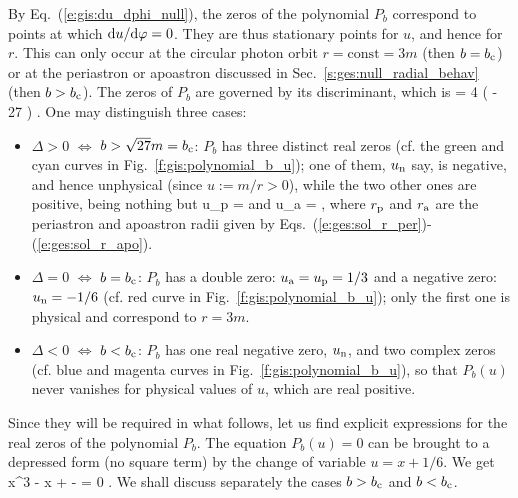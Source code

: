 By Eq.~(\ref{e:gis:du_dphi_null}), the zeros of the polynomial $P_b$
correspond to points at which $\mathrm{d} u /\mathrm{d}\varphi = 0$. They are thus stationary points
for $u$, and hence for $r$. This can only occur at the circular photon
orbit $r = \mathrm{const} = 3 m$ (then $b=b_{\rm c}$)
or at the periastron or apoastron discussed
in Sec.~\ref{s:ges:null_radial_behav} (then $b > b_{\rm c}$).
The zeros of $P_b$ are governed by its
discriminant, which is
\be
    \Delta = 4  \left(  - 27 \right) .
\ee
One may distinguish three cases:
\begin{itemize}
\item $\Delta>0$ $\iff$ $b > \sqrt{27} m = b_{\rm c}$: $P_b$ has three distinct
real zeros (cf. the green and cyan curves
in Fig.~\ref{f:gis:polynomial_b_u}); one of them, $u_{\rm n}$ say, is
negative, and hence unphysical (since $u:=m/r >0$),
while the two other ones are positive, being nothing but
\be \label{e:ges:def_u_per_apo}
    u_{\rm p} =  \qquad\mbox{and}\qquad
    u_{\rm a} =  ,
\ee
where $r_{\rm p}$ and $r_{\rm a}$ are the periastron and apoastron radii given by
Eqs.~(\ref{e:ges:sol_r_per})-(\ref{e:ges:sol_r_apo}).
\item $\Delta=0$ $\iff$ $b = b_{\rm c}$: $P_b$
has a double zero: $u_{\rm a} = u_{\rm p} =1/3$ and a negative zero:
$u_{\rm n}=-1/6$ (cf. red curve
in Fig.~\ref{f:gis:polynomial_b_u}); only the first
one is physical and correspond to $r=3m$.
\item $\Delta<0$ $\iff$ $b < b_{\rm c}$:
$P_b$ has one real negative zero, $u_{\rm n}$, and two complex zeros
(cf. blue and magenta curves in Fig.~\ref{f:gis:polynomial_b_u}),
so that $P_b(u)$ never vanishes
for physical values of $u$, which are real positive.
\end{itemize}

Since they will be required in what follows, let us
find explicit expressions for the real zeros of the polynomial $P_b$.
The equation $P_b(u) = 0$ can be brought to a depressed form (no square term)
by the change of variable $u = x + 1/6$. We get
\be \label{e:gis:zeros_Pb_eq_in_x}
    x^3 -  x +  -  = 0 .
\ee
We shall discuss separately the cases $b>b_{\rm c}$ and $b<b_{\rm c}$.

